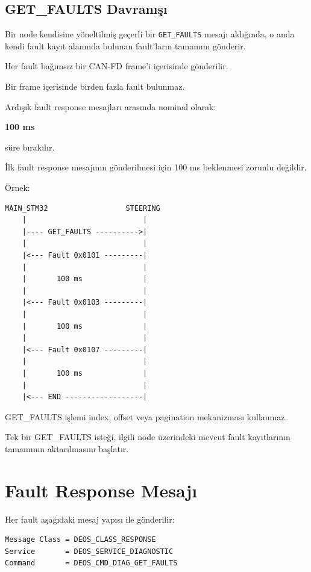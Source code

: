 \documentclass[a4paper,11pt]{article}
\begin{document}
\subsection{GET\_FAULTS Davranışı}

Bir node kendisine yöneltilmiş geçerli bir
\texttt{GET\_FAULTS} mesajı aldığında, o anda kendi fault kayıt
alanında bulunan fault'ların tamamını gönderir.

Her fault bağımsız bir CAN-FD frame'i içerisinde gönderilir.

Bir frame içerisinde birden fazla fault bulunmaz.

Ardışık fault response mesajları arasında nominal olarak:

\begin{center}
\textbf{100 ms}
\end{center}

süre bırakılır.

İlk fault response mesajının gönderilmesi için 100 ms beklenmesi
zorunlu değildir.

Örnek:

\begin{lstlisting}
MAIN_STM32                  STEERING
    |                           |
    |---- GET_FAULTS ---------->|
    |                           |
    |<--- Fault 0x0101 ---------|
    |                           |
    |       100 ms              |
    |                           |
    |<--- Fault 0x0103 ---------|
    |                           |
    |       100 ms              |
    |                           |
    |<--- Fault 0x0107 ---------|
    |                           |
    |       100 ms              |
    |                           |
    |<--- END ------------------|
\end{lstlisting}

GET\_FAULTS işlemi index, offset veya pagination mekanizması kullanmaz.

Tek bir GET\_FAULTS isteği, ilgili node üzerindeki mevcut fault
kayıtlarının tamamının aktarılmasını başlatır.

\section{Fault Response Mesajı}

Her fault aşağıdaki mesaj yapısı ile gönderilir:

\begin{lstlisting}
Message Class = DEOS_CLASS_RESPONSE
Service       = DEOS_SERVICE_DIAGNOSTIC
Command       = DEOS_CMD_DIAG_GET_FAULTS
\end{lstlisting}
\end{document}
